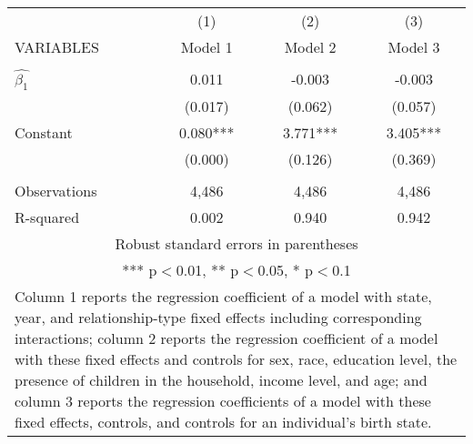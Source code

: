 \begin{tabular}{lccc}
\hline
 & (1) & (2) & (3) \\
VARIABLES & Model 1 & Model 2 & Model 3 \\ \hline
 &  &  &  \\
$\hat{\beta_1}$ & 0.011 & -0.003 & -0.003 \\
 & (0.017) & (0.062) & (0.057) \\
Constant & 0.080*** & 3.771*** & 3.405*** \\
 & (0.000) & (0.126) & (0.369) \\
 &  &  &  \\
Observations & 4,486 & 4,486 & 4,486 \\
 R-squared & 0.002 & 0.940 & 0.942 \\ \hline
\multicolumn{4}{c}{ Robust standard errors in parentheses} \\
\multicolumn{4}{c}{ *** p$<$0.01, ** p$<$0.05, * p$<$0.1} \\
\multicolumn{4}{p{0.6\linewidth}}{\footnotesize Column 1 reports the regression coefficient of a model with state, year, and relationship-type fixed effects including corresponding interactions; column 2 reports the regression coefficient of a model with these fixed effects and controls for sex, race, education level, the presence of children in the household, income level, and age; and column 3 reports the regression coefficients of a model with these fixed effects, controls, and controls for an individual’s birth state.} \\
\end{tabular}
